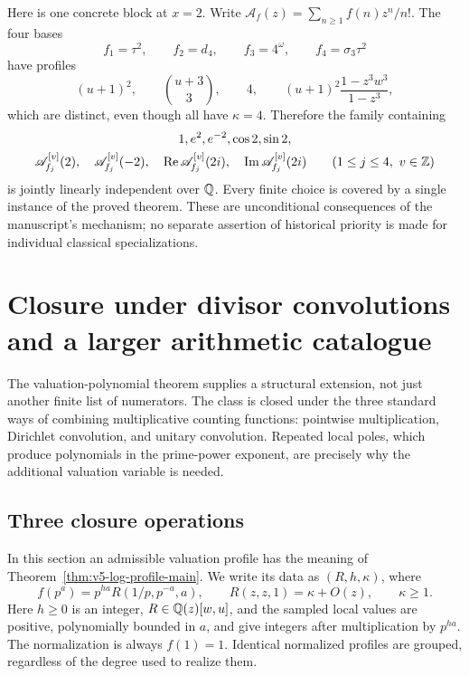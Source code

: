 Here is one concrete block at $x=2$. Write
$\mathscr A_f(z)=\sum_{n\geq1}f(n)z^n/n!$. The four bases
\[
 f_1=\tau^2,\qquad f_2=d_4,\qquad
 f_3=4^{\omega},\qquad f_4=\sigma_3\tau^2
\]
have profiles
\[
 (u+1)^2,\qquad \binom{u+3}{3},\qquad
 4,\qquad (u+1)^2\frac{1-z^3w^3}{1-z^3},
\]
which are distinct, even though all have $\kappa=4$.
Therefore the family containing
\begin{gather*}
 1,e^2,e^{-2},\cos2,\sin2,\\
 \mathscr A_{f_j}^{[v]}(2),\quad
 \mathscr A_{f_j}^{[v]}(-2),\quad
 \operatorname{Re}\mathscr A_{f_j}^{[v]}(2i),\quad
 \operatorname{Im}\mathscr A_{f_j}^{[v]}(2i)
 \qquad(1\leq j\leq4,\ v\in\mathbb Z)
\end{gather*}
is jointly linearly independent over $\mathbb Q$.
Every finite choice is covered by a single instance of the proved theorem.
These are unconditional consequences of the manuscript's mechanism;
no separate assertion of historical priority is made for individual
classical specializations.

\section{Closure under divisor convolutions and a larger arithmetic catalogue}
\label{v5:profile-universe}

The valuation-polynomial theorem supplies a structural extension, not just
another finite list of numerators.  The class is closed under the three
standard ways of combining multiplicative counting functions: pointwise
multiplication, Dirichlet convolution, and unitary convolution.  Repeated
local poles, which produce polynomials in the prime-power exponent, are
precisely why the additional valuation variable is needed.

\subsection{Three closure operations}

In this section an admissible valuation profile has the meaning of
Theorem~\ref{thm:v5-log-profile-main}.  We write its data as $(R,h,\kappa)$,
where
\[
 f(p^a)=p^{ha}R(1/p,p^{-a},a),\qquad
 R(z,z,1)=\kappa+O(z),\qquad \kappa\geq1.
\]
Here $h\geq0$ is an integer, $R\in\mathbb Q(z)[w,u]$, and the sampled local
values are positive, polynomially bounded in $a$, and give integers after
multiplication by $p^{ha}$.  The normalization is always $f(1)=1$.
Identical normalized profiles are grouped, regardless of the degree used
to realize them.

